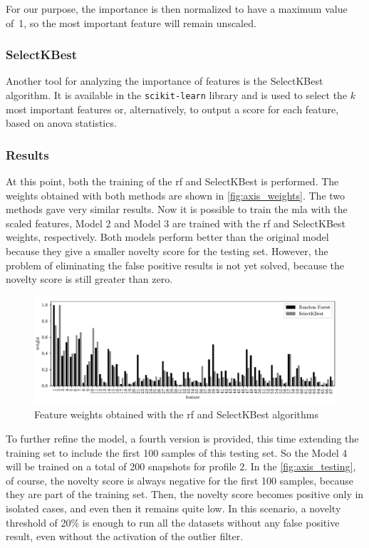 For our purpose, the importance is then normalized to have a maximum value of~1, so the most important feature will remain unscaled.

\subsubsection{SelectKBest}
Another tool for analyzing the importance of features is the SelectKBest algorithm. It is available in the \texttt{scikit-learn} library and is used to select the $k$ most important features or, alternatively, to output a score for each feature, based on \gls{anova} statistics.

\subsubsection{Results}
At this point, both the training of the \gls{rf} and SelectKBest is performed. The weights obtained with both methods are shown in \autoref{fig:axis_weights}. The two methods gave very similar results. Now it is possible to train the \gls{mla} with the scaled features, Model 2 and Model 3 are trained with the \gls{rf} and SelectKBest weights, respectively. Both models perform better than the original model because they give a smaller novelty score for the testing set. However, the problem of eliminating the false positive results is not yet solved, because the novelty score is still greater than zero.

\begin{figure}
    \centering
    \includegraphics[width=\textwidth]{images/LinearMotor/Feat_weights.pdf}
    \caption{Feature weights obtained with the \gls{rf} and SelectKBest algorithms}
    \label{fig:axis_weights}
\end{figure}

To further refine the model, a fourth version is provided, this time extending the training set to include the first 100 samples of this testing set. So the Model 4 will be trained on a total of 200 snapshots for profile 2. In the \autoref{fig:axis_testing}, of course, the novelty score is always negative for the first 100 samples, because they are part of the training set. Then, the novelty score becomes positive only in isolated cases, and even then it remains quite low. In this scenario, a novelty threshold of 20\% is enough to run all the datasets without any false positive result, even without the activation of the outlier filter.

